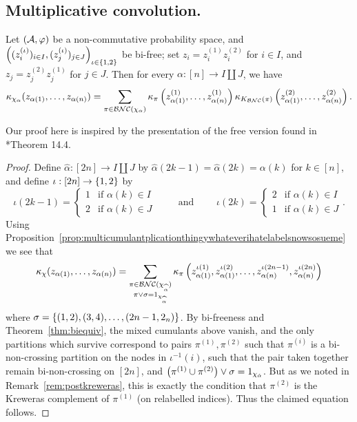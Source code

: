 \subsection{Multiplicative convolution.}
\begin{theorem}
	\label{thm:multiconv}
	Let $(\mathcal{A}, \varphi)$ be a non-commutative probability space, and $\left((z_i^{(\iota)})_{i\in I}, (z_j^{(\iota)})_{j\in J}\right)_{\iota\in\left\{1,2\right\}}$ be bi-free; set $z_i = z_i^{(1)}z_i^{(2)}$ for $i \in I$, and $z_j = z_j^{(2)}z_j^{(1)}$ for $j \in J$.
	Then for every $\alpha : [n] \to I\coprod J$, we have
	$$\kappa_{\chi_\alpha}(z_{\alpha(1)}, \ldots, z_{\alpha(n)})
	= \sum_{\pi\in\mathcal{BNC}(\chi_\alpha)}\kappa_\pi\left(z_{\alpha(1)}^{(1)}, \ldots, z_{\alpha(n)}^{(1)}\right)\kappa_{K_{\mathcal{BNC}}(\pi)}\left(z_{\alpha(1)}^{(2)}, \ldots, z_{\alpha(n)}^{(2)}\right).$$
\end{theorem}
Our proof here is inspired by the presentation of the free version found in \cite{nica2006lectures}*{Theorem 14.4}.
\begin{proof}
	Define $\widehat{\alpha} : [2n] \to I \coprod J$ by $\widehat{\alpha}(2k-1) = \widehat{\alpha}(2k) = \alpha(k)$ for $k \in [n]$, and define $\iota : [2n] \to \left\{1,2\right\}$ by
	\[
		\iota(2k-1)
	= \left\{
		\begin{array}{ll}
			1 & \text{if } \alpha(k) \in I
			\\
				2 & \text{if } \alpha(k) \in J
		\end{array} \right.
	\qquad \text{ and }\qquad \iota(2k) = 
	\left\{
		\begin{array}{ll}
			2 & \text{if } \alpha(k) \in I
			\\
			1 & \text{if } \alpha(k) \in J
		\end{array} \right..
	\]
	Using Proposition~\ref{prop:multicumulantplicationthingywhateverihatelabelsnowsosueme} we see that
	\[
		\kappa_\chi(z_{\alpha(1)}, \ldots, z_{\alpha(n)}) = \sum_{\substack{\pi \in \mathcal{BNC}(\chi_{\widehat{\alpha}}) \\ \pi \vee \sigma = 1_{\chi_{\widehat{\alpha}}}}} \kappa_\pi\left(z^{\iota(1)}_{\alpha(1)}, z^{\iota(2)}_{\alpha(1)}, \ldots, z^{\iota(2n-1)}_{\alpha(n)}, z^{\iota(2n)}_{\alpha(n)}\right)
	\]
	where $\sigma = \left\{(1,2), (3,4), \ldots, (2n-1, 2_n)\right\}$.
	By bi-freeness and Theorem~\ref{thm:biequiv}, the mixed cumulants above vanish, and the only partitions which survive correspond to pairs $\pi^{(1)}, \pi^{(2)}$ such that $\pi^{(i)}$ is a bi-non-crossing partition on the nodes in $\iota^{-1}(i)$, such that the pair taken together remain bi-non-crossing on $[2n]$, and $\left(\pi^{(1)}\cup\pi^{(2)}\right) \vee \sigma = 1_{\chi_{\hat\alpha}}$.
	But as we noted in Remark~\ref{rem:postkreweras}, this is exactly the condition that $\pi^{(2)}$ is the Kreweras complement of $\pi^{(1)}$ (on relabelled indices).
	Thus the claimed equation follows.
\end{proof}

